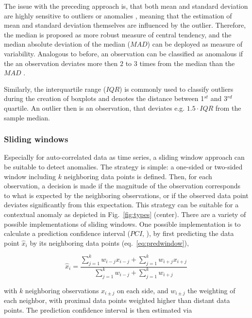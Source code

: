 \documentclass[conference]{IEEEtran}
\begin{document}
The issue with the preceding approach is, that both mean and standard deviation are highly sensitive to outliers or anomalies \cite{leys2013detecting}, meaning that the estimation of mean and standard deviation themselves are influenced by the outlier. Therefore, the median is proposed as more robust measure of central tendency, and the median absolute deviation of the median ($MAD$) can be deployed as measure of variability. Analogous to before, an observation can be classified as anomalous if the an observation deviates more then $2$ to $3$ times from the median than the $MAD$ \cite{leys2013detecting}.

Similarly, the interquartile range ($IQR$) is commonly used to classify outliers during the creation of boxplots \cite{dawson2011significant} and denotes the distance between 1$^{st}$ and 3$^{rd}$ quartile. An outlier then is an observation, that deviates e.g. $1.5 \cdot IQR$ from the sample median.

\subsubsection{Sliding windows}

Especially for auto-correlated data as time series, a sliding window approach can be suitable to detect anomalies. The strategy is simple: a one-sided or two-sided window including $k$ neighboring data points is defined. Then, for each observation, a decision is made if the magnitude of the observation corresponds to what is expected by the neighboring observations, or if the observed data point deviates significantly from this expectation. This strategy can be suitable for a contextual anomaly as depicted in Fig.~\ref{fig:types} (center). There are a variety of possible implementations of sliding windows. One possible implementation is to calculate a prediction confidence interval ($PCI$, \cite{yu2014time}), by first predicting the data point $\hat{x}_i$ by its neighboring data points (eq.~\ref{eq:predwindow}),

\begin{equation} \label{eq:predwindow}
    \hat{x}_i = \dfrac{\sum \limits_{j=1}^k w_{i-j} x_{i-j} + \sum \limits_{j=1}^k w_{i+j} x_{i+j} }{\sum \limits_{j=1}^k w_{i-j} + \sum \limits_{j=1}^k w_{i+j}}
\end{equation}

with $k$ neighboring observations $x_{i \pm j}$ on each side, and $w_{i \pm j}$ the weighting of each neighbor, with proximal data points weighted higher than distant data points. The prediction confidence interval is then estimated via
\end{document}
